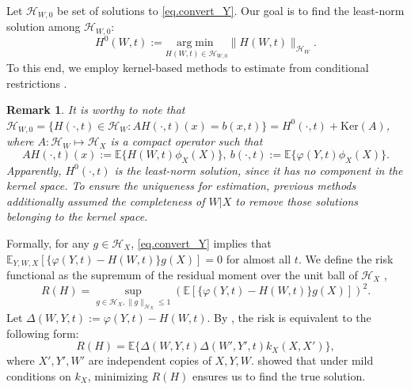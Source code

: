\documentclass[
  12pt]{article}
\newtheorem{remark}{Remark}
\def\mE{\mathbb{E}}
\def\cH{\mathcal{H}}
\def\mE{\mathbb{E}}
\begin{document}
Let $\cH_{W,0}$ be set of solutions to \eqref{eq.convert_Y}. Our goal is to find the least-norm solution among $\cH_{W,0}$: 
\begin{equation*}
    H^0(W,t) :=\underset{H(W,t) \in \cH_{W,0}}{\mathrm{arg}\min}\|H(W,t)\|_{\cH_W}.
\end{equation*}
To this end, we employ kernel-based methods to estimate from conditional restrictions \citep{zhang2020maximum,mastouri2021proximal,kallus2021causal,ghassami2022minimax}. 
\begin{remark}
    It is worthy to note that $\cH_{W,0}=\{H(\cdot,t)\in\mathcal{H}_W:AH(\cdot,t)(x)=b(x,t)\}=H^0(\cdot,t)+\mathrm{Ker}(A)$, where $A: \cH_W \mapsto \cH_X$ is a compact operator such that 
    \begin{equation}
    \label{eq.Ab}
        AH(\cdot,t)(x) :=\mE\{H(W,t)\phi_X(X)\}, \ b(\cdot,t):=\mE\{\varphi(Y,t)\phi_X(X)\}. 
    \end{equation}
    Apparently, $H^0(\cdot,t)$ is the least-norm solution, since it has no component in the kernel space. To ensure the uniqueness for estimation, previous methods additionally assumed the completeness of $W|X$ to remove those solutions belonging to the kernel space. 
\end{remark}
Formally, for any $g \in \cH_X$, \eqref{eq.convert_Y} implies that $\mathbb{E}_{Y,W,X}[\{\varphi(Y,t)-H(W,t)\}g(X)] = 0$ for almost all $t$.
We define the risk functional as the supremum of the residual moment over the unit ball of $\cH_X$ \citep{mastouri2021proximal},
\begin{equation}
\label{eq.unrestricted}
    R(H)=\underset{g\in \cH_X,\| g\|_{\cH_X} \le 1}{\sup}\left( \mathbb{E} \left[ \{\varphi(Y,t)-H(W,t)\} g(X) \right] \right)^2. 
\end{equation}
Let $\Delta(W,Y,t):=\varphi(Y,t)-H(W,t)$. By \cite{mastouri2021proximal}, the risk is equivalent to the following form:
\begin{equation}\label{eq:mmr_RH}
    R(H)=\mathbb{E} \{\Delta(W,Y,t)\Delta(W',Y',t)k_X(X,X')\},
\end{equation}
where $X',Y',W'$ are independent copies of $X, Y, W$. \cite{zhang2020maximum} showed that under mild conditions on $k_X$, minimizing $R(H)$ ensures us to find the true solution. 
\end{document}
